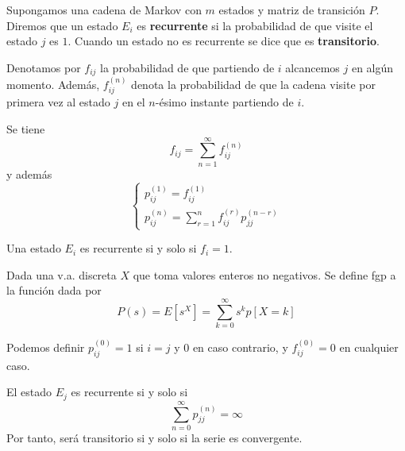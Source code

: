 \documentclass[PREyA.tex]{subfiles}
\begin{document}
\begin{defi}
Supongamos una cadena de Markov con $m$ estados y matriz de transición $P$. Diremos que un estado $E_i$ es \textbf{recurrente} si la probabilidad de que visite el estado $j$ es $1$. Cuando un estado no es recurrente se dice que es \textbf{transitorio}. 
\end{defi}
\begin{defi}
Denotamos por $f_{ij}$ la probabilidad de que partiendo de $i$ alcancemos $j$ en algún momento. Además, $f_{ij}^{(n)}$ denota la probabilidad de que la cadena visite por primera vez al estado $j$ en el $n$-ésimo instante partiendo de $i$. 
\end{defi}
\begin{prop}
Se tiene
$$
f_{ij} = \sum_{n=1}^\infty f_{ij}^{(n)}
$$
y además
$$
\begin{cases}
p_{ij}^{(1)} = f_{ij}^{(1)} \\
p_{ij}^{(n)} = \sum_{r=1}^{n}f_{ij}^{(r)}p_{jj}^{(n-r)}
\end{cases}
$$
\end{prop}
\begin{prop}
Una estado $E_i$ es recurrente si y solo si $f_i = 1$.
\end{prop}
\begin{defi}
Dada una v.a. discreta $X$ que toma valores enteros no negativos. Se define fgp a la función dada por
$$
P(s) = E[s^X] = \sum_{k=0}^\infty {s^k}p[X=k]
$$
\end{defi}
\begin{nota}
Podemos definir $p_{ij}^{(0)} = 1$ si $i=j$ y $0$ en caso contrario, y $f^{(0)}_{ij}=0$ en cualquier caso.
\end{nota}
\begin{theorem}
El estado $E_j$ es recurrente si y solo si
$$
\sum_{n = 0}^\infty p_{jj}^{(n)} = \infty
$$
Por tanto, será transitorio si y solo si la serie es convergente.
\end{theorem}
\end{document}
